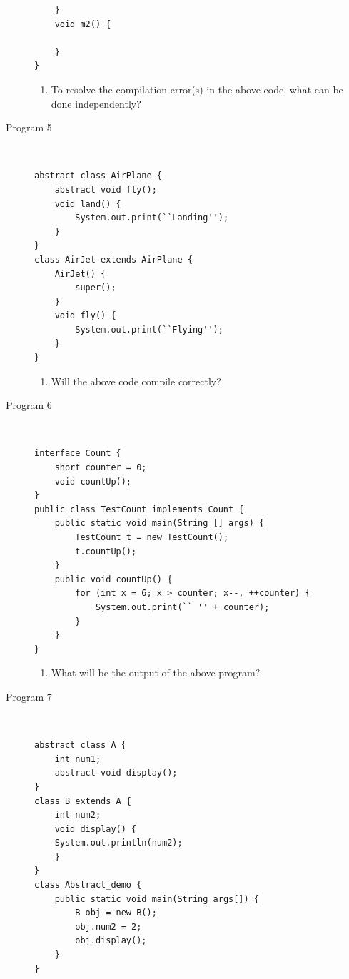 \documentclass[11pt,a4paper]{article}
\def\AnswerBox{\fbox{\begin{minipage}{4in}\hfill\vspace{0.5in}\end{minipage}}}
\begin{document}
\begin{description}
\begin{lstlisting}
    } 
    void m2() {
    
    } 
}
\end{lstlisting}

\AnswerBox

\begin{enumerate}[label=\bfseries Q\arabic*:]\itemsep10pt
\item To resolve the compilation error(s) in the above code, what can be done independently? 
\end{enumerate}

\item [Program 5] \
\begin{lstlisting}
abstract class AirPlane {
    abstract void fly();
    void land() { 
        System.out.print(``Landing'');
    }
}
class AirJet extends AirPlane {
    AirJet() {
        super();
    }
    void fly() {
        System.out.print(``Flying'');
    }
}
\end{lstlisting}

\AnswerBox

\begin{enumerate}[label=\bfseries Q\arabic*:]\itemsep10pt
\item Will the above code compile correctly?
    \end{enumerate}


\item [Program 6] \
\begin{lstlisting}
interface Count {
    short counter = 0;
    void countUp();
}
public class TestCount implements Count {
    public static void main(String [] args) {
        TestCount t = new TestCount();
        t.countUp();
    }
    public void countUp() {
        for (int x = 6; x > counter; x--, ++counter) {
            System.out.print(`` '' + counter);
        }
    }
}
\end{lstlisting}

\AnswerBox

\begin{enumerate}[label=\bfseries Q\arabic*:]\itemsep10pt
\item What will be the output of the above program?
\end{enumerate}


\item [Program 7] \
\begin{lstlisting}
abstract class A {
    int num1;
    abstract void display();
}    
class B extends A {
    int num2;
    void display() {
    System.out.println(num2);
    }
}
class Abstract_demo {
    public static void main(String args[]) {
        B obj = new B();
        obj.num2 = 2;
        obj.display();    
    }
}
\end{lstlisting}


\end{description}
\end{document}
